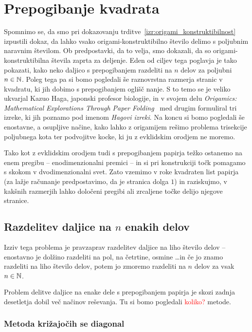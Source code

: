 \section{Prepogibanje kvadrata}
\label{pogl:prepog_kvadrata}

Spomnimo se, da smo pri dokazovanju trditve~\ref{izr:origami_konstruktibilnost} izpustili dokaz, da lahko vsako origami-konstruktibilno število delimo s poljubnim naravnim številom. Ob predpostavki, da to velja, smo dokazali, da so origami-konstruktibilna števila zaprta za deljenje. Eden od ciljev tega poglavja je tako pokazati, kako neko daljico s prepogibanjem razdeliti na $n$ delov za poljubni $n \in \mathbb N$. Poleg tega pa si bomo pogledali še raznovrstna razmerja stranic v kvadratu, ki jih dobimo s prepogibanjem oglišč nanje. S to temo se je veliko ukvarjal Kazuo Haga, japonski profesor biologije, in v svojem delu \emph{Origamics: Mathematical Explorations Through Paper Folding}~\cite{haga2008} med drugim formuliral tri izreke, ki jih poznamo pod imenom \emph{Hagovi izreki}. Na koncu si bomo pogledali še enostavne, a osupljive načine, kako lahko z origamijem rešimo problema trisekcije poljubnega kota ter podvojitve kocke, ki ju z evklidskim orodjem ne moremo.

Tako kot z evklidskim orodjem tudi s prepogibanjem papirja težko ostanemo na enem pregibu -- enodimenzionalni premici -- in si pri konstrukciji točk pomagamo s skokom v dvodimenzionalni svet. Zato vzemimo v roke kvadraten list papirja (za lažje računanje predpostavimo, da je stranica dolga $1$) in raziskujmo, v kakšnih razmerjih lahko določeni pregibi ali zrcaljene točke delijo njegove stranice.

\subsection{Razdelitev daljice na $n$ enakih delov}

Izziv tega problema je pravzaprav razdelitev daljice na liho število delov -- enostavno je dolžino razdeliti na pol, na četrtine, osmine \ldots in če jo znamo razdeliti na liho število delov, potem jo zmoremo razdeliti na $n$ delov za vsak $n \in \mathbb N$.

Problem delitve daljice na enake dele s prepogibanjem papirja je skozi zadnja desetletja dobil več načinov reševanja. Tu si bomo pogledali \textcolor{red}{koliko?} metode.

\subsubsection*{Metoda križajočih se diagonal}

